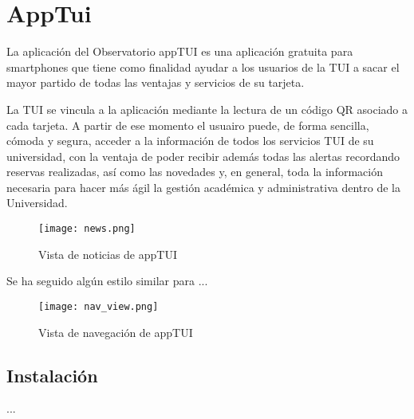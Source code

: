 \section{AppTui}

La aplicación del Observatorio appTUI \cite{URL::appTUI} es una aplicación gratuita para smartphones 
que tiene como finalidad ayudar a los usuarios de la TUI a sacar el mayor partido de 
todas las ventajas y servicios de su tarjeta. 

La TUI se vincula a la aplicación mediante la lectura de un código QR asociado a cada tarjeta. 
A partir de ese momento el usuairo puede, de forma sencilla, cómoda y segura, acceder a la 
información de todos los servicios TUI de su universidad, con la ventaja de poder recibir además
todas las alertas recordando reservas realizadas, así como las novedades y, en general, toda 
la información necesaria para hacer más ágil la gestión académica y administrativa dentro de la Universidad.

\begin{figure}[h]
	\centering
	\texttt{[image: news.png]}
	\caption{Vista de noticias de appTUI}
	\label{fig:ejemplo}
\end{figure}

Se ha seguido algún estilo similar para \App{} ...

\begin{figure}[h]
	\centering
	\texttt{[image: nav\_view.png]}
	\caption{Vista de navegación de appTUI}
	\label{fig:ejemplo}
\end{figure}

\subsection{Instalación}
...



